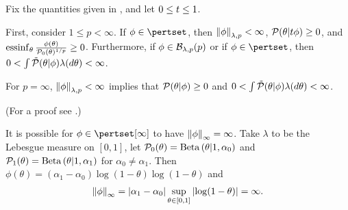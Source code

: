\begin{lem}
%
Fix the quantities given in , and let $0 \le t \le 1$.

First, consider $1 \le p < \infty$.  If $\phi \in \pertset$, then
$\left\Vert\phi\right\Vert_{\lambda,p} < \infty$, $\mathcal{P}(\theta \vert t \phi) \ge 0$, and
$\operatorname*{\mathrm{essinf}}_{\theta} \frac{\phi(\theta)}{\mathcal{P}_{0}(\theta)^{1/p}} \ge 0$. Furthermore,
if $\phi \in \mathcal{B}_{\lambda,p}(p)$ or if $\phi \in \pertset$, then $0 < \int
\tilde{\mathcal{P}}(\theta \vert \phi) \lambda(d\theta) <{} \infty$.


For $p = \infty$, $\left\Vert\phi\right\Vert_{\lambda,p} < \infty$ implies that $\mathcal{P}(\theta
\vert \phi) \ge 0$ and $0 < \int \tilde{\mathcal{P}}(\theta \vert \phi) \lambda(d\theta) <{}
\infty$.


(For a proof see  .)
%
\end{lem}



\begin{ex}
%
It is possible for $\phi \in \pertset[\infty]$ to have $\left\Vert\phi\right\Vert_{\infty} =
\infty$.  Take $\lambda$ to be the Lebesgue measure on $[0,1]$, let
$\mathcal{P}_{0}(\theta) = \mathrm{Beta}\left(\theta \vert 1, \alpha_0\right)$ and $\mathcal{P}_{1}(\theta) =
\mathrm{Beta}\left(\theta \vert 1, \alpha_1\right)$ for $\alpha_0 \ne \alpha_1$.  Then
$\phi(\theta) = (\alpha_1 - \alpha_0) \log(1 - \theta) \log(1 - \theta)$
%
and
%
\begin{align*}
%
\norminf{\phi} =
    \abs{\alpha_1 - \alpha_0} \sup_{\theta \in [0,1]} \abs{\log(1 - \theta)} =
    \infty.
%
\end{align*}
%
\end{ex}

